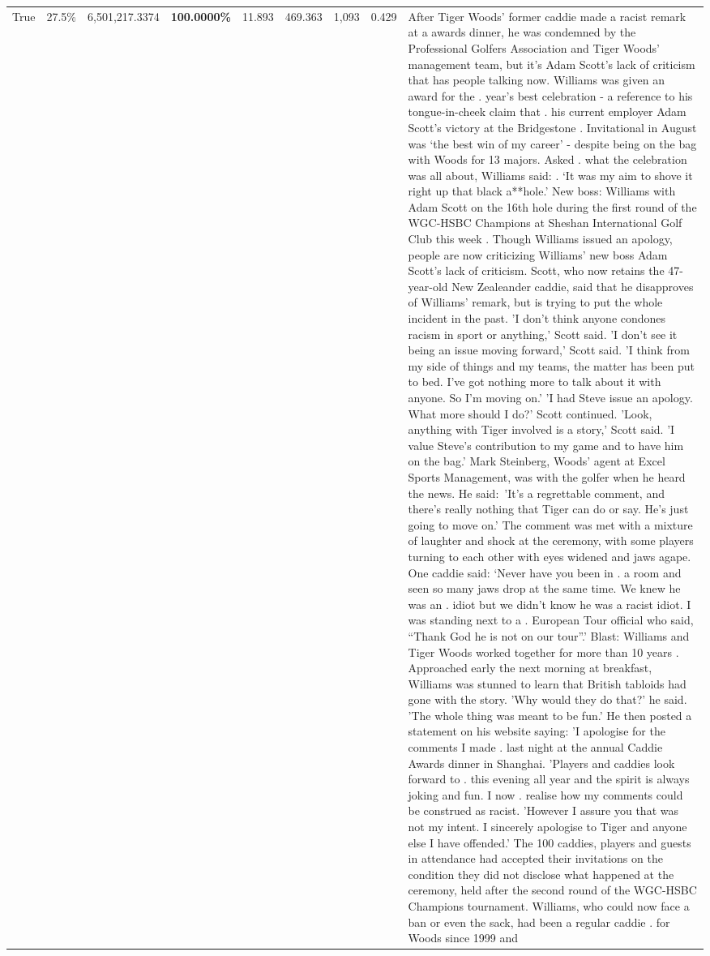 \begin{table}[H]
\begin{tabular}{lllrlllll}
True & 27.5\% & 6,501,217.3374 & \bfseries \color{red} 100.0000\% & 11.893 & 469.363 & 1,093 & 0.429 & After Tiger Woods' former caddie made a racist remark at a awards dinner, he was condemned by the Professional Golfers Association and Tiger Woods' management team, but it's Adam Scott's lack of criticism that has people talking now. Williams was given an award for the . year’s best celebration - a reference to his tongue-in-cheek claim that . his current employer Adam Scott’s victory at the Bridgestone . Invitational in August was ‘the best win of my career’ - despite being on the bag with Woods for 13 majors. Asked . what the celebration was all about, Williams said: . ‘It was my aim to shove it right up that black a**hole.’ New boss: Williams with Adam Scott  on the 16th hole during the first round of the WGC-HSBC Champions at Sheshan International Golf Club this week . Though Williams issued an apology, people are now criticizing Williams' new boss Adam Scott's lack of criticism. Scott, who now retains the 47-year-old New Zealeander caddie, said that he disapproves of Williams' remark, but is trying to put the whole incident in the past. 'I don't think anyone condones racism in sport or anything,' Scott said. 'I don't see it being an issue moving forward,' Scott said. 'I think from my side of things and my teams, the matter has been put to bed. I've got nothing more to talk about it with anyone. So I'm moving on.' 'I had Steve issue an apology. What more should I do?' Scott continued. 'Look, anything with Tiger involved is a story,' Scott said. 'I value Steve's contribution to my game and to have him on the bag.' Mark Steinberg, Woods' agent at Excel Sports Management, was with the golfer when he heard the news. He said: 'It's a regrettable comment, and there's really nothing that Tiger can do or say. He's just going to move on.' The comment was met with a mixture of laughter and shock at the ceremony, with some players turning to each other with eyes widened and jaws agape. One caddie said: ‘Never have you been in . a room and seen so many jaws drop at the same time. We knew he was an . idiot but we didn’t know he was a racist idiot. I was standing next to a . European Tour official who said, “Thank God he is not on our tour”.’ Blast: Williams and Tiger Woods worked together for more than 10 years . Approached early the next morning at breakfast, Williams was stunned to learn that British tabloids had gone with the story. 'Why would they do that?' he said. 'The whole thing was meant to be fun.' He then posted a statement on his website saying: 'I apologise for the comments I made . last night at the annual Caddie Awards dinner in Shanghai. 'Players and caddies look forward to . this evening all year and the spirit is always joking and fun. I now . realise how my comments could be construed as racist. 'However I assure you that was not my intent. I sincerely apologise to Tiger and anyone else I have offended.' The 100 caddies, players and guests in attendance had accepted their invitations on the condition they did not disclose what happened at the ceremony, held after the second round of the WGC-HSBC Champions tournament. Williams, who could now face a ban or even the sack, had been a regular caddie . for Woods since 1999 and 
\end{tabular}
\end{table}
